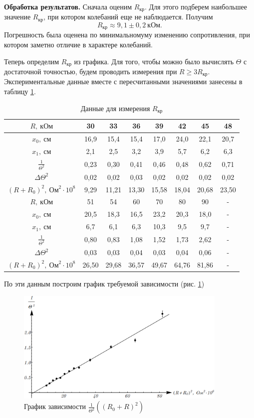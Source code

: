\documentclass[12pt,a4paper]{article}
\begin{document}
\textbf{Обработка результатов.} Сначала оценим $R_\text{кр}$. Для этого подберем наибольшее значение $R_\text{кр}$, при котором колебаний еще не наблюдается. Получим
\begin{equation}
R_\text{кр} \approx 9,1 \pm 0,2~\text{кОм}.
\end{equation}
Погрешность была оценена по минимальномуму изменению сопротивления, при котором заметно отличие в характере колебаний.

Теперь определим $R_\text{кр}$ из графика. Для того, чтобы можно было вычислять $\Theta$ с достаточной точностью, будем проводить измерения при $R \geq 3R_\text{кр}$. Экспериментальные данные вместе с пересчитанными значениями занесены в таблицу \ref{tab2}.
\begin{table}[ht]\centering
\begin{tabular}{|*{8}{c|}}
\hline
$R,~\text{кОм}$&30&33&36&39&42&45&48\\
\hline
$x_0,~\text{см}$&16,9&15,4&15,4&17,0&24,0&22,1&20,7\\
\hline
$x_1,~\text{см}$&2,1&2,5&3,2&3,9&5,7&6,2&6,3\\
\hline
$\frac{1}{\Theta^2}$&0,23&0,30&0,41&0,46&0,48&0,62&0,71\\
\hline
$\Delta\Theta^2$&0,02&0,02&0,03&0,02&0,02&0,02&0,02\\
\hline
$\left(R+R_0\right)^2,~\text{Ом}^2\cdot10^8$&9,29&11,21&13,30&15,58&18,04&20,68&23,50\\
\hline
$R,~\text{кОм}$&51&54&60&70&80&90&-\\
\hline
$x_0,~\text{см}$&20,5&18,3&16,5&23,2&20,3&18,0&-\\
\hline
$x_1,~\text{см}$&6,7&6,1&6,3&10,3&9,5&9,7&-\\
\hline
$\frac{1}{\Theta^2}$&0,80&0,83&1,08&1,52&1,73&2,62&-\\
\hline
$\Delta\Theta^2$&0,03&0,03&0,04&0,03&0,04&0,06&-\\
\hline
$\left(R+R_0\right)^2,~\text{Ом}^2\cdot10^8$&26,50&29,68&36,57&49,67&64,76&81,86&-\\
\hline
\end{tabular}
\caption{Данные для измерения $R_\text{кр}$ \label{tab2}}
\end{table}
По эти данным построим график требуемой зависимости (рис. \ref{Fig4})
\medskip

\begin{figure}[h]\centering
\includegraphics[width = 0.9\textwidth]{Plot2}
\captionsetup{justification = centering}
\caption{График зависимости $\frac{1}{\Theta^2}\left(\left(R_0+R\right)^2\right)$ \label{Fig4}}
\end{figure}
\end{document}
